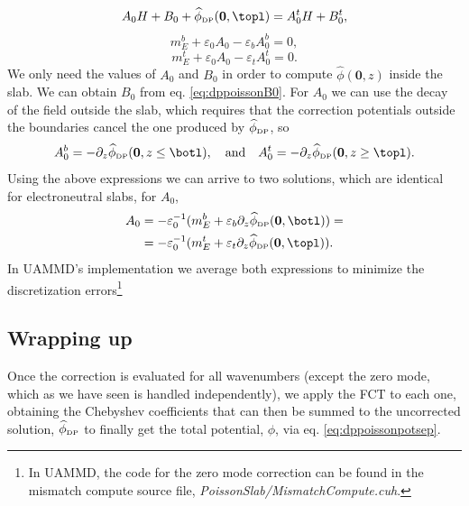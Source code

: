 \documentclass[ twoside,openright,titlepage,numbers=noenddot,%
headinclude,footinclude,cleardoublepage=empty,abstract=on,
BCOR=5mm,paper=a4,fontsize=11pt, dvipsnames
]{scrreprt}
\renewcommand{\vec}[1]{\bm{#1}}
\newcommand{\uammd}{\gls{UAMMD}\xspace}
\newcommand{\fou}[1]{\widehat{#1}}
\newcommand{\corr}{\text{corr}}
\newcommand{\dpr}{\text{\tiny DP}}
\begin{document}
\begin{equation}
  A_0H + B_0 + \fou{\phi}_{\dpr}(\vec{0}, \topl) = A_0^tH + B_0^t,
\end{equation}
\begin{equation}
  m_E^b +\varepsilon_0A_0-\varepsilon_bA_0^b = 0,
\end{equation}
\begin{equation}
  m_E^t +\varepsilon_0A_0-\varepsilon_tA_0^t = 0.
\end{equation}
We only need the values of $A_0$ and $B_0$ in order to compute $\fou{\phi}(\vec{0},z)$ inside the slab. We can obtain $B_0$ from eq. \eqref{eq:dppoissonB0}. For $A_0$ we can use the decay of the field outside the slab, which requires that the correction potentials outside the boundaries cancel the one produced by $\fou{\phi}_{\dpr}$, so
\begin{equation}
  A_0^b = -\partial_z\fou{\phi}_{\dpr}(\vec{0}, z\le\botl),\quad\text{and}\quad A_0^t = -\partial_z\fou{\phi}_{\dpr}(\vec{0}, z\ge\topl).
\end{equation}
Using the above expressions we can arrive to two solutions, which are identical for electroneutral slabs, for $A_0$,
\begin{equation}
  \begin{aligned}
    A_0 &= -\varepsilon_0^{-1}(m_E^b +\varepsilon_b\partial_z\fou{\phi}_{\dpr}(\vec{0}, \botl)) =\\
    &= -\varepsilon_0^{-1}(m_E^t +\varepsilon_t\partial_z\fou{\phi}_{\dpr}(\vec{0}, \topl)).
\end{aligned}
\end{equation}
In \uammd's implementation we average both expressions to minimize the discretization errors\footnote{In \uammd, the code for the zero mode correction can be found in the mismatch compute source file, \emph{PoissonSlab/MismatchCompute.cuh}.}

%
%
%

\subsection{Wrapping up}
Once the correction is evaluated for all wavenumbers (except the zero mode, which as we have seen is handled independently), we apply the \gls{FCT} to each one, obtaining the Chebyshev coefficients that can then be summed to the uncorrected solution, $\fou{\phi}_{\dpr}$ to finally get the total potential, $\phi$, via eq. \eqref{eq:dppoissonpotsep}.
\end{document}
